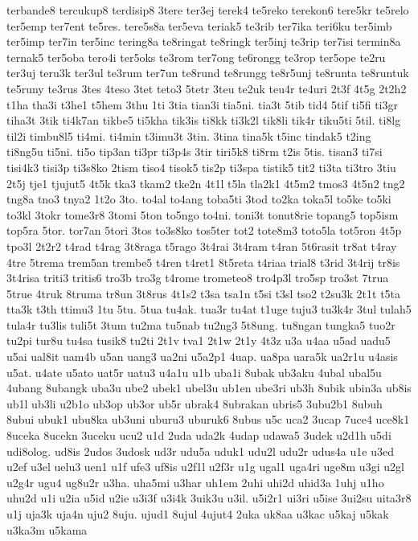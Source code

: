 {terbande8 tercukup8 terdisip8 3tere ter3ej terek4 te5reko terekon6 tere5kr
te5relo ter5emp ter7ent te5res. tere5s8a ter5eva teriak5 te3rib ter7ika
teri6ku ter5imb ter5imp ter7in ter5inc tering8a te8ringat te8ringk ter5inj
te3rip ter7isi termin8a ternak5 ter5oba tero4i ter5oks te3rom ter7ong
te6rongg te3rop ter5ope te2ru ter3uj teru3k ter3ul te3rum ter7un te8rund
te8rungg te8r5unj te8runta te8runtuk te5runy te3rus 3tes 4teso 3tet teto3
5tetr 3teu te2uk teu4r te4uri 2t3f 4t5g 2t2h2 t1ha tha3i t3he1 t5hem 3thu
1ti 3tia tian3i tia5ni. tia3t 5tib tid4 5tif ti5fi ti3gr tiha3t 3tik
ti4k7an tikbe5 ti5kha tik3is ti8kk ti3k2l tik8li tik4r tiku5ti 5til. ti8lg
til2i timbu8l5 ti4mi. ti4min t3imu3t 3tin. 3tina tina5k t5inc tindak5
t2ing ti8ng5u ti5ni. ti5o tip3an ti3pr ti3p4s 3tir tiri5k8 ti8rm t2is
5tis. tisan3 ti7si tisi4k3 tisi3p ti3s8ko 2tism tiso4 tisok5 tis2p ti3spa
tistik5 tit2 ti3ta ti3tro 3tiu 2t5j tje1 tjujut5 4t5k tka3 tkam2 tke2n
4t1l t5la tla2k1 4t5m2 tmos3 4t5n2 tng2 tng8a tno3 tnya2 1t2o 3to. to4al
to4ang toba5ti 3tod to2ka toka5l to5ke to5ki to3kl 3tokr tome3r8 3tomi
5ton to5ngo to4ni. toni3t tonut8rie topang5 top5ism top5ra 5tor. tor7an
5tori 3tos to3s8ko tos5ter tot2 tote8m3 toto5la tot5ron 4t5p tpo3l 2t2r2
t4rad t4rag 3t8raga t5rago 3t4rai 3t4ram t4ran 5t6rasit tr8at t4ray 4tre
5trema trem5an trembe5 t4ren t4ret1 8t5reta t4riaa trial8 t3rid 3t4rij
tr8is 3t4risa triti3 tritis6 tro3b tro3g t4rome trometeo8 tro4p3l tro5sp
tro3st 7trua 5true 4truk 8truma tr8un 3t8rus 4t1s2 t3sa tsa1n t5si t3sl
tso2 t2su3k 2t1t t5ta tta3k t3th ttimu3 1tu 5tu. 5tua tu4ak. tua3r tu4at
t1uge tuju3 tu3k4r 3tul tulah5 tula4r tu3lis tuli5t 3tum tu2ma tu5nab
tu2ng3 5t8ung. tu8ngan tungka5 tuo2r tu2pi tur8u tu4sa tusik8 tu2ti 2t1v
tva1 2t1w 2t1y 4t3z u3a u4aa u5ad uadu5 u5ai ual8it uam4b u5an uang3 ua2ni
u5a2p1 4uap. ua8pa uara5k ua2r1u u4asis u5at. u4ate u5ato uat5r uatu3
u4a1u u1b uba1i 8ubak ub3aku 4ubal ubal5u 4ubang 8ubangk uba3u ube2 ubek1
ubel3u ub1en ube3ri ub3h 8ubik ubin3a ub8is ub1l ub3li u2b1o ub3op ub3or
ub5r ubrak4 8ubrakan ubris5 3ubu2b1 8ubuh 8ubui ubuk1 ubu8ka ub3uni uburu3
uburuk6 8ubus u5c uca2 3ucap 7uce4 uce8k1 8uceka 8ucekn 3uceku ucu2 u1d
2uda uda2k 4udap udawa5 3udek u2d1h u5di udi8olog. ud8is 2udos 3udosk ud3r
udu5a uduk1 udu2l udu2r udus4a u1e u3ed u2ef u3el uelu3 uen1 u1f ufe3
uf8is u2f1l u2f3r u1g ugal1 uga4ri uge8m u3gi u2gl u2g4r ugu4 ug8u2r u3ha.
uha5mi u3har uh1em 2uhi uhi2d uhid3a 1uhj u1ho uhu2d u1i u2ia u5id u2ie
u3i3f u3i4k 3uik3u u3il. u5i2r1 ui3ri u5ise 3ui2su uita3r8 u1j uja3k uja4n
uju2 8uju. ujud1 8ujul 4ujut4 2uka uk8aa u3kac u5kaj u5kak u3ka3m u5kama
}
